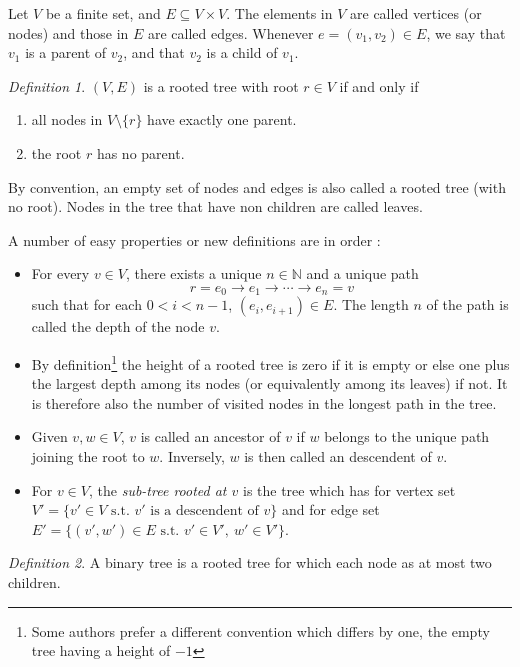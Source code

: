 \documentclass[12pt]{article}
\theoremstyle{plain}
\theoremstyle{remark}
\newtheorem*{definition}{Definition}
\newcommand{\N}{\mathbb{N}}
\begin{document}
Let $V$ be a finite set, and $E \subseteq V \times V.$ The elements in $V$
are called vertices (or nodes) and those in $E$ are called edges. Whenever $e =
(v_1,v_2) \in E$, we say that $v_1$ is a parent of $v_2$, and that $v_2$ is a
child of $v_1$.

\begin{definition} 
$(V,E)$ is a rooted tree with root $r \in V$ if and only if
	\begin{enumerate}
		\item all nodes in $V \setminus \{r\}$ have exactly one parent.
		\item the root $r$ has no parent.
	\end{enumerate}
By convention, an empty set of nodes and edges is also called a rooted tree
(with no root). Nodes in the tree that have non children are called leaves.
\end{definition}

A number of easy properties or new definitions are in order :

\begin{itemize}
	\item
		For every $v \in V$, there exists a unique $n \in \N$ and a
		unique path
		$$
		r = e_0 \to e_1 \to \cdots \to e_n = v 
		$$
		such that for each $0 < i < n-1$, $(e_i,e_{i+1}) \in E$. The
		length $n$ of the path is called the depth of the node $v$. 
	\item
		By definition\footnote{Some authors prefer a different
		convention which differs by one, the empty tree having a height
		of $-1$} the height of a rooted tree is zero if it is empty
		or else one plus the largest depth among its nodes (or
		equivalently among its leaves) if not. It is therefore also the
		number of visited nodes in the longest path in the tree.
	\item   Given $v, w \in V$, $v$ is called an ancestor of $v$ if $w$ belongs to 
		the unique path joining the root to $w$.
		Inversely, $w$ is then called an descendent of $v$.
	\item   For $v \in V$, the {\it sub-tree rooted at $v$} is the tree which has 
		for vertex set $V' = \{
			v' \in V \text{ s.t. } v' \text{ is a descendent of }
			v\}$ and for edge set $E' = \{(v',w') \in E \text{ s.t. }
		v'\in V',\ w' \in V'\}$.
\end{itemize}

\begin{definition} 
A binary tree is a rooted tree for which each node as at most two children.
\end{definition}
\end{document}
